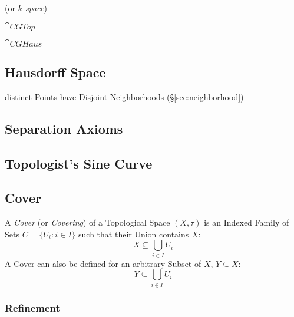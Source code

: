 (or \emph{$k$-space})

$\cat{CGTop}$

$\cat{CGHaus}$



\subsection{Hausdorff Space}\label{sec:hausdorff_space}

distinct Points have Disjoint Neighborhoods (\S\ref{sec:neighborhood})



\subsection{Separation Axioms}\label{sec:separation_axioms}

\subsection{Topologist's Sine Curve}\label{sec:topologists_sine}

\subsection{Cover}\label{sec:topological_cover}

A \emph{Cover} (or \emph{Covering}) of a Topological Space $(X, \tau)$
is an Indexed Family of Sets $C = \{ U_i : i \in I \}$ such that their
Union contains $X$:
\[
  X \subseteq \bigcup_{i \in I} U_i
\]
A Cover can also be defined for an arbitrary Subset of $X$, $Y
\subseteq X$:
\[
  Y \subseteq \bigcup_{i \in I} U_i
\]

\subsubsection{Refinement}\label{sec:refinement}



